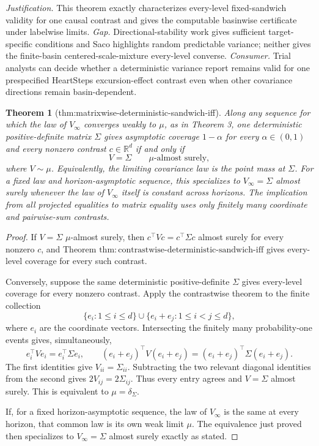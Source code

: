\documentclass{article}
\newtheorem{theorem}{Theorem}
\begin{document}
\par\smallskip\noindent \textit{Justification.} This theorem exactly characterizes every-level fixed-sandwich validity for one causal contrast and gives the computable basinwise certificate under labelwise limits. \textit{Gap.} Directional-stability work gives sufficient target-specific conditions and Saco highlights random predictable variance; neither gives the finite-basin centered-scale-mixture every-level converse. \textit{Consumer.} Trial analysts can decide whether a deterministic variance report remains valid for one prespecified HeartSteps excursion-effect contrast even when other covariance directions remain basin-dependent.

\begin{theorem}[thm:matrixwise-deterministic-sandwich-iff]\label{thm:matrixwise-deterministic-sandwich-iff}
Along any sequence for which the law of \(V_\infty\) converges weakly to \(\mu\), as in Theorem 3, one deterministic positive-definite matrix \(\Sigma\) gives asymptotic coverage \(1-\alpha\) for every \(\alpha\in(0,1)\) and every nonzero contrast \(c\in\mathbb R^d\) if and only if
\[
 V=\Sigma\qquad\mu\text{-almost surely},
\]
where \(V\sim\mu\). Equivalently, the limiting covariance law is the point mass at \(\Sigma\). For a fixed law and horizon-asymptotic sequence, this specializes to \(V_\infty=\Sigma\) almost surely whenever the law of \(V_\infty\) itself is constant across horizons. The implication from all projected equalities to matrix equality uses only finitely many coordinate and pairwise-sum contrasts.
\end{theorem}
\begin{proof}
If \(V=\Sigma\) \(\mu\)-almost surely, then \(c^\top Vc=c^\top\Sigma c\) almost surely for every nonzero \(c\), and Theorem \(\mathrm{thm:contrastwise\text{-}deterministic\text{-}sandwich\text{-}iff}\) gives every-level coverage for every such contrast.

Conversely, suppose the same deterministic positive-definite \(\Sigma\) gives every-level coverage for every nonzero contrast.  Apply the contrastwise theorem to the finite collection
\[
 \{e_i:1\le i\le d\}\cup\{e_i+e_j:1\le i<j\le d\},
\]
where \(e_i\) are the coordinate vectors.  Intersecting the finitely many probability-one events gives, simultaneously,
\[
 e_i^\top Ve_i=e_i^\top\Sigma e_i,
 \qquad
 (e_i+e_j)^\top V(e_i+e_j)=(e_i+e_j)^\top\Sigma(e_i+e_j).
\]
The first identities give \(V_{ii}=\Sigma_{ii}\).  Subtracting the two relevant diagonal identities from the second gives \(2V_{ij}=2\Sigma_{ij}\).  Thus every entry agrees and \(V=\Sigma\) almost surely.  This is equivalent to \(\mu=\delta_\Sigma\).

If, for a fixed horizon-asymptotic sequence, the law of \(V_\infty\) is the same at every horizon, that common law is its own weak limit \(\mu\).  The equivalence just proved then specializes to \(V_\infty=\Sigma\) almost surely exactly as stated.
\end{proof}
\end{document}
